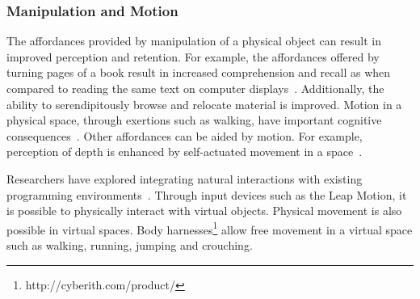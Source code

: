 \documentclass[conference]{IEEEtran}
\begin{document}


\subsubsection{Manipulation and Motion}

The affordances provided by manipulation of a physical object can result in improved perception and retention. 
For example, the affordances offered by turning pages of a book result in increased comprehension and recall as when compared to reading the same text on computer displays~\cite{Noyes:2008}.
Additionally, the ability to serendipitously browse and relocate material is improved.
Motion in a physical space, through exertions such as walking, have important cognitive consequences~\cite{Oppezzo:2014}.
Other affordances can be aided by motion. For example, perception of depth is enhanced by self-actuated movement in a space~\cite{Held:1963}.

Researchers have explored integrating natural interactions with existing programming environments~\cite{Delimarschi:2014}.
Through input devices such as the Leap Motion, it is possible to physically interact with virtual objects.
Physical movement is also possible in virtual spaces.  Body harnesses\footnote{http://cyberith.com/product/} allow free movement in a virtual space such as walking, running, jumping and crouching.%

\end{document}
